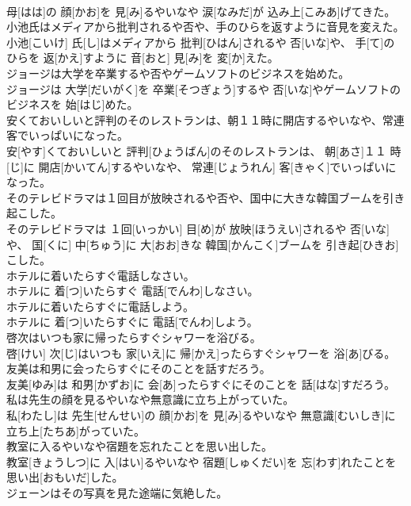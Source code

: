 \documentclass[8pt]{extreport}
\begin{document}
\begin{CJK}{UTF8}{min}
\\	母[はは]の 顔[かお]を 見[み]るやいなや 涙[なみだ]が 込み上[こみあ]げてきた。
\\	小池氏はメディアから批判されるや否や、手のひらを返すように音見を変えた。	
\\	小池[こいけ] 氏[し]はメディアから 批判[ひはん]されるや 否[いな]や、 手[て]のひらを 返[かえ]すように 音[おと] 見[み]を 変[か]えた。
\\	ジョージは大学を卒業するや否やゲームソフトのビジネスを始めた。	
\\	ジョージは 大学[だいがく]を 卒業[そつぎょう]するや 否[いな]やゲームソフトのビジネスを 始[はじ]めた。
\\	安くておいしいと評判のそのレストランは、朝１１時に開店するやいなや、常連客でいっぱいになった。	
\\	安[やす]くておいしいと 評判[ひょうばん]のそのレストランは、 朝[あさ]１１ 時[じ]に 開店[かいてん]するやいなや、 常連[じょうれん] 客[きゃく]でいっぱいになった。
\\	そのテレビドラマは１回目が放映されるや否や、国中に大きな韓国ブームを引き起こした。	
\\	そのテレビドラマは １回[いっかい] 目[め]が 放映[ほうえい]されるや 否[いな]や、 国[くに] 中[ちゅう]に 大[おお]きな 韓国[かんこく]ブームを 引き起[ひきお]こした。
\\	ホテルに着いたらすぐ電話しなさい。	
\\	ホテルに 着[つ]いたらすぐ 電話[でんわ]しなさい。
\\	ホテルに着いたらすぐに電話しよう。	
\\	ホテルに 着[つ]いたらすぐに 電話[でんわ]しよう。
\\	啓次はいつも家に帰ったらすぐシャワーを浴びる。	
\\	啓[けい] 次[じ]はいつも 家[いえ]に 帰[かえ]ったらすぐシャワーを 浴[あ]びる。
\\	友美は和男に会ったらすぐにそのことを話すだろう。	
\\	友美[ゆみ]は 和男[かずお]に 会[あ]ったらすぐにそのことを 話[はな]すだろう。
\\	私は先生の顔を見るやいなや無意識に立ち上がっていた。	
\\	私[わたし]は 先生[せんせい]の 顔[かお]を 見[み]るやいなや 無意識[むいしき]に 立ち上[たちあ]がっていた。
\\	教室に入るやいなや宿題を忘れたことを思い出した。	
\\	教室[きょうしつ]に 入[はい]るやいなや 宿題[しゅくだい]を 忘[わす]れたことを 思い出[おもいだ]した。
\\	ジェーンはその写真を見た途端に気絶した。	

\end{CJK}
\end{document}
